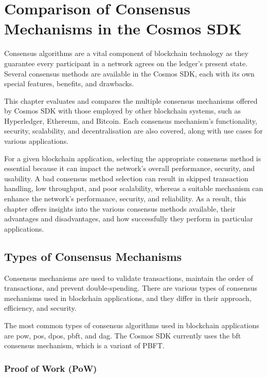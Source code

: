 \chapter{Comparison of Consensus Mechanisms in the Cosmos SDK}
\label{ch:compare}

Consensus algorithms are a vital component of blockchain technology as they guarantee every participant in a network agrees on the ledger's present state. Several consensus methods are available in the Cosmos SDK, each with its own special features, benefits, and drawbacks.

This chapter evaluates and compares the multiple consensus mechanisms offered by Cosmos SDK with those employed by other blockchain systems, such as Hyperledger, Ethereum, and Bitcoin. Each consensus mechanism's functionality, security, scalability, and decentralisation are also covered, along with use cases for various applications.

For a given blockchain application, selecting the appropriate consensus method is essential because it can impact the network's overall performance, security, and usability. A bad consensus method selection can result in skipped transaction handling, low throughput, and poor scalability, whereas a suitable mechanism can enhance the network's performance, security, and reliability.  As a result, this chapter offers insights into the various consensus methods available, their advantages and disadvantages, and how successfully they perform in particular applications.

\section{Types of Consensus Mechanisms}

Consensus mechanisms are used to validate transactions, maintain the order of transactions, and prevent double-spending. There are various types of consensus mechanisms used in blockchain applications, and they differ in their approach, efficiency, and security.

The most common types of consensus algorithms used in blockchain applications are \gls{pow}, \gls{pos}, \gls{dpos}, \gls{pbft}, and \gls{dag}. The Cosmos SDK currently uses the \gls{bft} consensus mechanism, which is a variant of PBFT.


\subsection{Proof of Work (PoW)}

